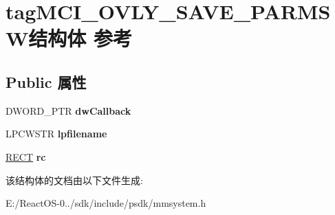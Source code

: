 \hypertarget{structtag_m_c_i___o_v_l_y___s_a_v_e___p_a_r_m_s_w}{}\section{tag\+M\+C\+I\+\_\+\+O\+V\+L\+Y\+\_\+\+S\+A\+V\+E\+\_\+\+P\+A\+R\+M\+S\+W结构体 参考}
\label{structtag_m_c_i___o_v_l_y___s_a_v_e___p_a_r_m_s_w}
\subsection*{Public 属性}
\begin{DoxyCompactItemize}
\item 
\mbox{\label{structtag_m_c_i___o_v_l_y___s_a_v_e___p_a_r_m_s_w_a5a6007bca89b82e7438e937387393b9b}} 
D\+W\+O\+R\+D\+\_\+\+P\+TR {\bfseries dw\+Callback}
\item 
\mbox{\label{structtag_m_c_i___o_v_l_y___s_a_v_e___p_a_r_m_s_w_aa374a908bf7b3b2f62f50c335377d4c4}} 
L\+P\+C\+W\+S\+TR {\bfseries lpfilename}
\item 
\mbox{\label{structtag_m_c_i___o_v_l_y___s_a_v_e___p_a_r_m_s_w_a8090b742b63a2a03c8c1e1fd6ef990d2}} 
\hyperlink{structtag_r_e_c_t}{R\+E\+CT} {\bfseries rc}
\end{DoxyCompactItemize}


该结构体的文档由以下文件生成\+:\begin{DoxyCompactItemize}
\item 
E\+:/\+React\+O\+S-\/0../sdk/include/psdk/mmsystem.\+h\end{DoxyCompactItemize}
